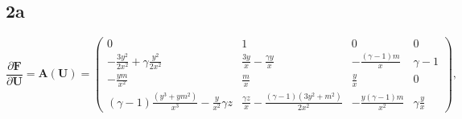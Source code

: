 \documentclass[12pt]{article}
\begin{document}
\subsection{2a}

\begin{equation}
	\frac{\partial \bm{F}}{\partial \bm{U}}=\boldsymbol{A}(\boldsymbol{U})=
	\begin{pmatrix}
	0 & 1 & 0 &0 \\
	-\frac{3y^2}{2x^2} + \gamma \frac{y^2}{2x^2} & \frac{3y}{x} - \frac{\gamma y}{x} & -\frac{(\gamma-1)m}{x}&\gamma-1 \\
	-\frac{ym}{x^2}&\frac{m}{x}&\frac{y}{x}&0\\
	(\gamma-1)\frac{(y^3+ym^2)}{x^3} -\frac{y}{x^2}\gamma z & \frac{\gamma z}{x} - \frac{(\gamma -1)(3y^2+m^2)}{2x^2} &-\frac{y(\gamma-1)m}{x^2}& \gamma \frac{y}{x}
	\end{pmatrix},
\end{equation}
\end{document}
